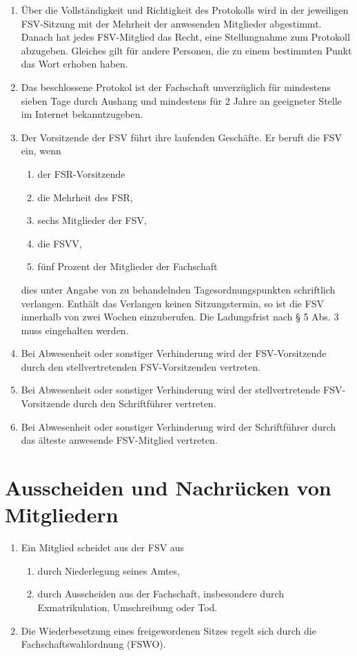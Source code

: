 \documentclass{article}
\begin{document}
\begin{enumerate}[(1)]
	\item Über die Vollständigkeit und Richtigkeit des Protokolls wird in der jeweiligen FSV-Sitzung mit der Mehrheit der anwesenden Mitglieder abgestimmt. Danach hat jedes FSV-Mitglied das Recht, eine Stellungnahme zum Protokoll abzugeben. Gleiches gilt für andere Personen, die zu einem bestimmten Punkt das Wort erhoben haben.
	\item Das beschlossene Protokol ist der Fachschaft
    unverzüglich für mindestens sieben Tage durch Aushang und mindestens für 2 Jahre an geeigneter Stelle im Internet bekanntzugeben.
	\item Der Vorsitzende der FSV führt ihre laufenden Geschäfte. Er beruft die FSV ein, wenn
	\begin{enumerate}[1.]
	    \item der FSR-Vorsitzende
        \item die Mehrheit des FSR,
		\item sechs Mitglieder der FSV,
		\item die FSVV,
		\item fünf Prozent der Mitglieder der Fachschaft 
	\end{enumerate}
	dies unter Angabe von zu behandelnden Tagesordnungspunkten schriftlich verlangen. Enthält das Verlangen keinen Sitzungstermin, so ist die FSV innerhalb von zwei Wochen einzuberufen. Die Ladungsfrist nach § 5 Abs. 3 muss eingehalten werden.
	\item Bei Abwesenheit oder sonstiger Verhinderung wird der FSV-Vorsitzende durch den stellvertretenden FSV-Vorsitzenden vertreten.
	\item Bei Abwesenheit oder sonstiger Verhinderung wird der stellvertretende FSV-Vorsitzende durch den Schriftführer vertreten.
	\item Bei Abwesenheit oder sonstiger Verhinderung wird der Schriftführer durch das älteste anwesende FSV-Mitglied vertreten.
\end{enumerate}

\section{Ausscheiden und Nachrücken von Mitgliedern}
\begin{enumerate}[(1)]
    \item Ein Mitglied scheidet aus der FSV aus
    	\begin{enumerate}[1.]
	    \item durch Niederlegung seines Amtes,
        \item durch Ausscheiden aus der Fachschaft, insbesondere durch Exmatrikulation, Umschreibung oder Tod.
	\end{enumerate}
	\item Die Wiederbesetzung eines freigewordenen Sitzes regelt sich durch die Fachschaftswahlordnung (FSWO). 
\end{enumerate}
\end{document}
